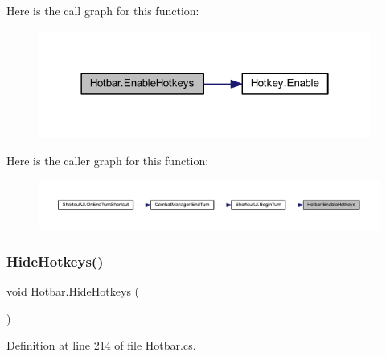 Here is the call graph for this function\+:
\nopagebreak
\begin{figure}[H]
\begin{center}
\leavevmode
\includegraphics[width=310pt]{class_hotbar_a37bca03a1dfd144a30bae3774eaab667_cgraph}
\end{center}
\end{figure}
Here is the caller graph for this function\+:
\nopagebreak
\begin{figure}[H]
\begin{center}
\leavevmode
\includegraphics[width=350pt]{class_hotbar_a37bca03a1dfd144a30bae3774eaab667_icgraph}
\end{center}
\end{figure}
\mbox{\label{class_hotbar_a2f8af9863292223ae00d361121164160}} 
\subsubsection{\texorpdfstring{HideHotkeys()}{HideHotkeys()}}
{\footnotesize\ttfamily void Hotbar.\+Hide\+Hotkeys (\begin{DoxyParamCaption}{ }\end{DoxyParamCaption})}



Definition at line 214 of file Hotbar.\+cs.

